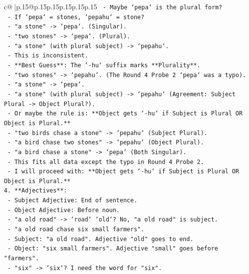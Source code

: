 \documentclass{article}
\begin{document}
{\begin{supertabular}{c@{$\;$}|p{.15\linewidth}@{}p{.15\linewidth}p{.15\linewidth}p{.15\linewidth}p{.15\linewidth}p{.15\linewidth}}
{{{\texttt{      {-} Maybe `pepa` is the plural form?} \\
\texttt{      {-} If `pepa` = stones, `pepahu` = stone?} \\
\texttt{      {-} "a stone" {-}> `pepa`. (Singular).} \\
\texttt{      {-} "two stones" {-}> `pepa`. (Plural).} \\
\texttt{      {-} "a stone" (with plural subject) {-}> `pepahu`.} \\
\texttt{      {-} This is inconsistent.} \\
\texttt{      {-} **Best Guess**: The `{-}hu` suffix marks **Plurality**.} \\
\texttt{      {-} "two stones" {-}> `pepahu`. (The Round 4 Probe 2 `pepa` was a typo).} \\
\texttt{      {-} "a stone" {-}> `pepa`.} \\
\texttt{      {-} "a stone" (with plural subject) {-}> `pepahu` (Agreement: Subject Plural {-}> Object Plural?).} \\
\texttt{      {-} Or maybe the rule is: **Object gets `{-}hu` if Subject is Plural OR Object is Plural.**} \\
\texttt{      {-} "two birds chase a stone" {-}> `pepahu` (Subject Plural).} \\
\texttt{      {-} "a bird chase two stones" {-}> `pepahu` (Object Plural).} \\
\texttt{      {-} "a bird chase a stone" {-}> `pepa` (Both Singular).} \\
\texttt{      {-} This fits all data except the typo in Round 4 Probe 2.} \\
\texttt{      {-} I will proceed with: **Object gets `{-}hu` if Subject is Plural OR Object is Plural.**} \\
\texttt{4.  **Adjectives**:} \\
\texttt{    {-} Subject Adjective: End of sentence.} \\
\texttt{    {-} Object Adjective: Before noun.} \\
\texttt{    {-} "a old road" {-}> `road` `old`? No, "a old road" is subject.} \\
\texttt{    {-} "a old road chase six small farmers".} \\
\texttt{    {-} Subject: "a old road". Adjective "old" goes to end.} \\
\texttt{    {-} Object: "six small farmers". Adjective "small" goes before "farmers".} \\
\texttt{    {-} "six" {-}> `six`? I need the word for "six".} \\
}}}
\end{supertabular}}
\end{document}
